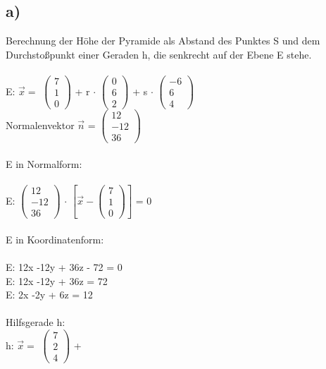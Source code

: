 \documentclass{article}
\begin{document}
	\subsection*{a)}
	Berechnung der Höhe der Pyramide als Abstand des Punktes S und dem Durchstoßpunkt einer Geraden h, die senkrecht auf der Ebene E stehe. \\ \\
	E: $\vec{x} =$
	$\left(\begin{array}{c}
	7 \\ 1 \\ 0
	\end{array}\right)$ + 
	r $\cdot$ 
	$\left(\begin{array}{c}
	0 \\ 6 \\ 2
	\end{array}\right)$ +
	s $\cdot$ 
	$\left(\begin{array}{c}
	-6 \\ 6 \\ 4
	\end{array}\right)$ \\
	Normalenvektor $\vec{n}$ =
	$\left(\begin{array}{c}
	 12 \\ -12 \\ 36
	\end{array}\right) $ \\ \\
	E in Normalform: \\ \\
	E:
	$\left(\begin{array}{c}
	12 \\ -12 \\ 36
	\end{array}\right)$
	$\cdot$
	$\left[\vec{x} - \left(\begin{array}{c}
	7 \\ 1 \\ 0
	\end{array}\right) \right]$ = 0 \\
	\\
	E in Koordinatenform: \\ \\
	E: 12x -12y + 36z - 72 = 0 \\
	E: 12x -12y + 36z =  72 \\
	E: 2x -2y + 6z = 12 \\ \\
	Hilfsgerade h: \\
	h: 
	$\vec{x} =$
	$\left(\begin{array}{c}
	7 \\ 2 \\ 4
	\end{array}\right)$ + 
\end{document}
